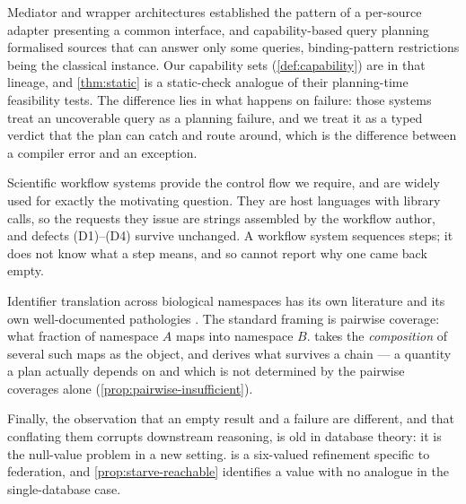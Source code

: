 Mediator and wrapper architectures \citep{Wiederhold1992,GarciaMolina1997,Haas1997}
established the pattern of a per-source adapter presenting a common interface,
and capability-based query planning \citep{Levy1996,Papakonstantinou1995,Florescu1999,Yerneni1999}
formalised sources that can answer only some queries, binding-pattern
restrictions being the classical instance. Our capability sets
(\cref{def:capability}) are in that lineage, and \cref{thm:static} is a
static-check analogue of their planning-time feasibility tests. The difference
lies in what happens on failure: those systems treat an uncoverable query as a
planning failure, and we treat it as a typed verdict that the plan can catch
and route around, which is the difference between a compiler error and an
exception.

Scientific workflow systems \citep{Wolstencroft2013,Berthold2009,Koster2012,DiTommaso2017}
provide the control flow we require, and are widely used for exactly the
motivating question. They are host languages with library calls, so the requests
they issue are strings assembled by the workflow author, and defects
(D1)--(D4) survive unchanged. A workflow system sequences steps; it does not
know what a step means, and so cannot report why one came back empty.

Identifier translation across biological namespaces has its own literature and
its own well-documented pathologies \citep{Chen2005,VanIersel2010,Wimalaratne2018,Juty2012,Ison2016}.
The standard framing is pairwise coverage: what fraction of namespace $A$ maps
into namespace $B$.  takes the \emph{composition} of
several such maps as the object, and derives what survives a chain --- a
quantity a plan actually depends on and which is not determined by the pairwise
coverages alone (\cref{prop:pairwise-insufficient}).

Finally, the observation that an empty result and a failure are different, and
that conflating them corrupts downstream reasoning, is old in database theory:
it is the null-value problem \citep{Codd1979,Imielinski1984,Libkin2016} in a new
setting.  is a six-valued refinement specific to federation,
and \cref{prop:starve-reachable} identifies a value with no analogue in the
single-database case.
